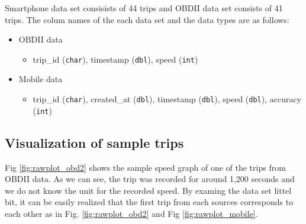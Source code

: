 \documentclass[letterpaper,9pt,twocolumn,twoside,]{pinp}
\providecommand{\tightlist}{%
  \setlength{\itemsep}{0pt}\setlength{\parskip}{0pt}}
\begin{document}
Smartphone data set consisists of 44 trips and OBDII data set consists
of 41 trips. The colum names of the each data set and the data types are
as follows:

\begin{itemize}
\tightlist
\item
  OBDII data

  \begin{itemize}
  \tightlist
  \item
    trip\_id (\texttt{char}), timestamp (\texttt{dbl}), speed
    (\texttt{int})
  \end{itemize}
\item
  Mobile data

  \begin{itemize}
  \tightlist
  \item
    trip\_id (\texttt{char}), created\_at (\texttt{dbl}), timestamp
    (\texttt{dbl}), speed (\texttt{dbl}), accuracy (\texttt{int})
  \end{itemize}
\end{itemize}

\hypertarget{visualization-of-sample-trips}{%
\subsection{Visualization of sample
trips}\label{visualization-of-sample-trips}}

Fig \ref{fig:rawplot_obd2} shows the sample speed graph of one of the
trips from OBDII data. As we can see, the trip was recorded for around
1,200 seconds and we do not know the unit for the recorded speed. By
examing the data set littel bit, it can be easily realized that the
first trip from each sources corresponds to each other as in Fig.
\ref{fig:rawplot_obd2} and Fig \ref{fig:rawplot_mobile}.
\end{document}

